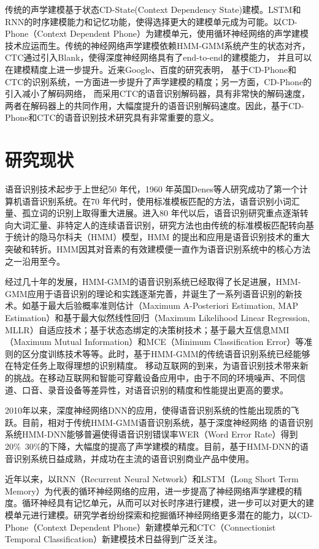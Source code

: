 传统的声学建模基于状态CD-State(Context Dependency State)建模。LSTM和RNN的时序建模能力和记忆功能，使得选择更大的建模单元成为可能。以CD-Phone（Context Dependent Phone）为建模单元，使用循环神经网络的声学建模技术应运而生。传统的神经网络声学建模依赖HMM-GMM系统产生的状态对齐，CTC通过引入Blank，使得深度神经网络具有了end-to-end的建模能力，
并且可以在建模精度上进一步提升。近来Google、百度的研究表明，
基于CD-Phone和CTC的识别系统，一方面进一步提升了声学建模的精度；另一方面，CD-Phone的引入减小了解码网络，
而采用CTC的语音识别解码器，具有非常快的解码速度，两者在解码器上的共同作用，大幅度提升的语音识别解码速度。因此，基于CD-Phone和CTC的语音识别技术研究具有非常重要的意义。

\section{研究现状}

语音识别技术起步于上世纪50 年代，1960 年英国Denes等人研究成功了第一个计算机语音识别系统。在70 年代时，使用标准模板匹配的方法，语音识别小词汇量、孤立词的识别上取得重大进展。进入80 年代以后，语音识别研究重点逐渐转向大词汇量、非特定人的连续语音识别，研究方法也由传统的标准模板匹配转向基于统计的隐马尔科夫（HMM）模型，HMM 的提出和应用是语音识别技术的重大突破和转折。HMM因其对音素的有效建模便一直作为语音识别系统中的核心方法之一沿用至今。

经过几十年的发展，HMM-GMM的语音识别系统已经取得了长足进展，HMM-GMM应用于语音识别的理论和实践逐渐完善，并诞生了一系列语音识别的新技术。如基于最大后验概率准则估计（Maximum A-Posteriori Estimation, MAP Estimation）和基于最大似然线性回归（Maximum Likelihood Linear Regression, MLLR）自适应技术；基于状态态绑定的决策树技术；基于最大互信息MMI（Maximum Mutual Information）和MCE（Minimum Classification Error）等准则的区分度训练技术等等。此时，基于HMM-GMM的传统语音识别系统已经能够在特定任务上取得理想的识别精度。
移动互联网的到来，为语音识别技术带来新的挑战。在移动互联网和智能可穿戴设备应用中，由于不同的环境噪声、不同信道、口音、录音设备等差异性，对语音识别的精度和性能提出更高的要求。

2010年以来，深度神经网络DNN的应用，使得语音识别系统的性能出现质的飞跃。目前，相对于传统HMM-GMM语音识别系统，基于深度神经网络
的语音识别系统HMM-DNN能够普遍使得语音识别错误率WER（Word Error Rate）得到20\%~30\%的下降，大幅度的提高了声学建模的精度。目前，基于HMM-DNN的语音识别系统日益成熟，并成功在主流的语音识别商业产品中使用。

近年以来，以RNN（Recurrent Neural Network）和LSTM（Long Short Term Memory）为代表的循环神经网络的应用，进一步提高了神经网络声学建模的精度。循环神经具有记忆单元，从而可以对长时序进行建模，进一步可以对更大的建模单元进行建模。研究学者纷纷探索和挖掘循环神经网络更多潜在的能力，以CD-Phone（Context Dependent Phone）新建模单元和CTC（Connectionist  Temporal Classification）新建模技术日益得到广泛关注。


